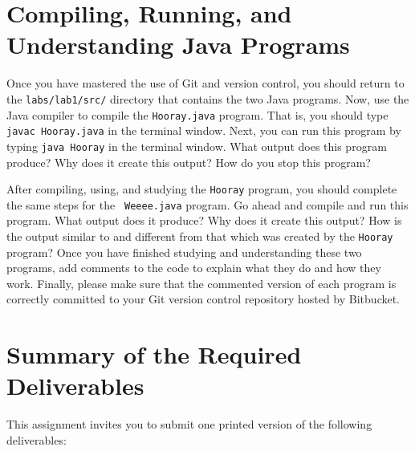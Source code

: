 \section*{Compiling, Running, and Understanding Java Programs}

  Once you have mastered the use of Git and version control, you should return to the {\tt labs/lab1/src/} directory that
  contains the two Java programs. Now, use the Java compiler to compile the {\tt Hooray.java} program.  That is, you
  should type {\tt javac Hooray.java} in the terminal window.  Next, you can run this program by typing {\tt java
  Hooray} in the terminal window.  What output does this program produce?  Why does it create this output? How do you
  stop this program? 

  After compiling, using, and studying the {\tt Hooray} program, you should complete the same steps for the {\tt
  Weeee.java} program. Go ahead and compile and run this program.  What output does it produce? Why does it create this
  output? How is the output similar to and different from that which was created by the {\tt Hooray} program? Once you
  have finished studying and understanding these two programs, add comments to the code to explain what they do and how
  they work. Finally, please make sure that the commented version of each program is correctly committed to your Git
  version control repository hosted by Bitbucket.
  

\section*{Summary of the Required Deliverables}

  This assignment invites you to submit one printed version of the following deliverables:

